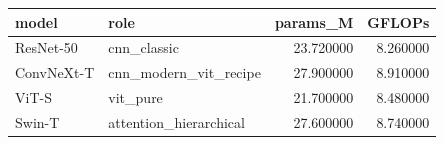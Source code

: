 \begin{tabular}{llrr}
\toprule
model & role & params_M & GFLOPs \\
\midrule
ResNet-50 & cnn_classic & 23.720000 & 8.260000 \\
ConvNeXt-T & cnn_modern_vit_recipe & 27.900000 & 8.910000 \\
ViT-S & vit_pure & 21.700000 & 8.480000 \\
Swin-T & attention_hierarchical & 27.600000 & 8.740000 \\
\bottomrule
\end{tabular}
